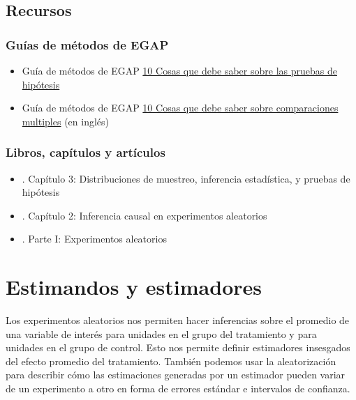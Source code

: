 \documentclass[12pt,spanish,]{book}
\begin{document}
\hypertarget{recursos-3}{%
\section{Recursos}\label{recursos-3}}

\hypertarget{guuxedas-de-muxe9todos-de-egap-2}{%
\subsection{Guías de métodos de EGAP}\label{guuxedas-de-muxe9todos-de-egap-2}}

\begin{itemize}
\item
  Guía de métodos de EGAP \href{https://egap.org/es/resource/10-cosas-que-debe-saber-sobre-las-pruebas-de-hipotesis/}{10 Cosas que debe saber sobre las pruebas de hipótesis}
\item
  Guía de métodos de EGAP \href{https://egap.org/resource/10-things-to-know-about-multiple-comparisons/}{10 Cosas que debe saber sobre comparaciones multiples} (en inglés)
\end{itemize}

\hypertarget{libros-capuxedtulos-y-artuxedculos-2}{%
\subsection{Libros, capítulos y artículos}\label{libros-capuxedtulos-y-artuxedculos-2}}

\begin{itemize}
\item
  \autocite{gerber_field_2012}. Capítulo 3: Distribuciones de muestreo, inferencia estadística, y pruebas de hipótesis
\item
  \autocite{rosenbaum2010design}. Capítulo 2: Inferencia causal en experimentos aleatorios
\item
  \autocite{rosenbaum2017observation}. Parte I: Experimentos aleatorios
\end{itemize}

\hypertarget{estimandos-y-estimadores}{%
\chapter{Estimandos y estimadores}\label{estimandos-y-estimadores}}

Los experimentos aleatorios nos permiten hacer inferencias sobre el promedio de una variable de interés para unidades en el grupo del tratamiento y para unidades en el grupo de control. Esto nos permite definir estimadores insesgados del efecto promedio del tratamiento. También podemos usar la aleatorización para describir cómo las estimaciones generadas por un estimador pueden variar de un experimento a otro en forma de errores estándar e intervalos de confianza.
\end{document}
